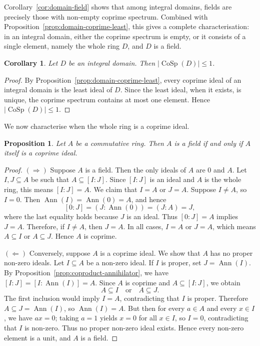 \documentclass{amsart}
\newtheorem{proposition}{Proposition}
\newtheorem{corollary}{Corollary}
\DeclareMathOperator{\ann}{Ann}
\begin{document}
Corollary~\ref{cor:domain-field} shows that among integral domains, fields are precisely those with non-empty coprime spectrum. Combined with Proposition~\ref{prop:domain-coprime-least}, this gives a complete characterisation: in an integral domain, either the coprime spectrum is empty, or it consists of a single element, namely the whole ring $D$, and $D$ is a field.

\begin{corollary}\label{cor:domain-cosp-cardinality}
Let $D$ be an integral domain. Then $|\operatorname{CoSp}(D)| \leq 1$.
\end{corollary}

\begin{proof}
By Proposition~\ref{prop:domain-coprime-least}, every coprime ideal of an integral domain is the least ideal of $D$. Since the least ideal, when it exists, is unique, the coprime spectrum contains at most one element. Hence $|\operatorname{CoSp}(D)| \leq 1$.
\end{proof}

We now characterise when the whole ring is a coprime ideal.

\begin{proposition}\label{prop:ring-field-coprime}
Let $A$ be a commutative ring. Then $A$ is a field if and only if $A$ itself is a coprime ideal.
\end{proposition}

\begin{proof}
$(\Rightarrow)$ Suppose $A$ is a field. Then the only ideals of $A$ are $0$ and $A$. Let $I,J \subseteq A$ be such that $A \subseteq [I:J]$. Since $[I:J]$ is an ideal and $A$ is the whole ring, this means $[I:J] = A$. We claim that $I = A$ or $J = A$. Suppose $I \neq A$, so $I = 0$. Then $\ann(I) = \ann(0) = A$, and hence
\[
[0:J] = (J:\ann(0)) = (J:A) = J,
\]
where the last equality holds because $J$ is an ideal. Thus $[0:J] = A$ implies $J = A$. Therefore, if $I \neq A$, then $J = A$. In all cases, $I = A$ or $J = A$, which means $A \subseteq I$ or $A \subseteq J$. Hence $A$ is coprime.

$(\Leftarrow)$ Conversely, suppose $A$ is a coprime ideal. We show that $A$ has no proper non-zero ideals. Let $I \subseteq A$ be a non-zero ideal. If $I$ is proper, set $J = \ann(I)$. By Proposition~\ref{prop:coproduct-annihilator}, we have $[I:J] = [I:\ann(I)] = A$. Since $A$ is coprime and $A \subseteq [I:J]$, we obtain
\[
A \subseteq I \quad \text{or} \quad A \subseteq J.
\]
The first inclusion would imply $I = A$, contradicting that $I$ is proper. Therefore $A \subseteq J = \ann(I)$, so $\ann(I) = A$. But then for every $a \in A$ and every $x \in I$, we have $ax = 0$; taking $a = 1$ yields $x = 0$ for all $x \in I$, so $I = 0$, contradicting that $I$ is non-zero. Thus no proper non-zero ideal exists. Hence every non-zero element is a unit, and $A$ is a field.
\end{proof}
\end{document}
